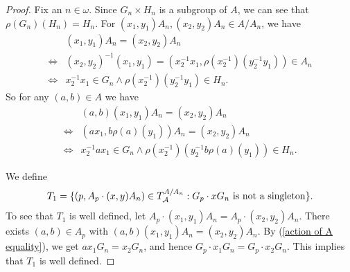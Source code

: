 \documentclass[11pt]{amsart}
\theoremstyle{definition}
\theoremstyle{remark}
\numberwithin{equation}{section}
\def\itxr#1{{\mbox{\textrm{ #1}}}}
\begin{document}
\begin{proof}
    Fix an $n\in\omega$. Since $G_n\times H_n$ is a subgroup of $A$, we can see that $\rho(G_n)(H_n)=H_n$. For $(x_1,y_1)A_n,(x_2,y_2)A_n\in A/A_n$, we have
    \begin{equation}
        \begin{aligned}
            &(x_1,y_1)A_n=(x_2,y_2)A_n\\
            \iff&(x_2,y_2)^{-1}(x_1,y_1)=\left(x_2^{-1}x_1,\rho(x_2^{-1})(y_2^{-1}y_1)\right)\in A_n\\
            \iff&x_2^{-1}x_1\in G_n\land\rho(x_2^{-1})(y_2^{-1}y_1)\in H_n.
        \end{aligned}
        \label{coset equality}
    \end{equation}
    So for any $(a,b)\in A$ we have
    \begin{equation}
        \begin{aligned}
            &(a,b)(x_1,y_1)A_n=(x_2,y_2)A_n\\
            \iff&(ax_1,b\rho(a)(y_1))A_n=(x_2,y_2)A_n\\
            \iff&x_2^{-1}ax_1\in G_n\land\rho(x_2^{-1})(y_2^{-1}b\rho(a)(y_1))\in H_n.
        \end{aligned}
        \label{action of A equality}
    \end{equation}

We define
    $$T_1=\{(p,A_p\cdot (x,y)A_n)\in T_{\mathcal{A}}^{A/A_n}:G_p\cdot xG_n\itxr{is not a singleton}\}.$$
To see that $T_1$ is well defined, let $A_p\cdot (x_1,y_1)A_n=A_p\cdot (x_2,y_2)A_n$. There exists $(a,b)\in A_p$ with $(a,b)(x_1,y_1)A_n=(x_2,y_2)A_n$.
By (\ref{action of A equality}), we get $ax_1G_n=x_2G_n$, and hence $G_p\cdot x_1G_n=G_p\cdot x_2G_n$. This implies that $T_1$ is well defined.


\end{proof}
\end{document}
